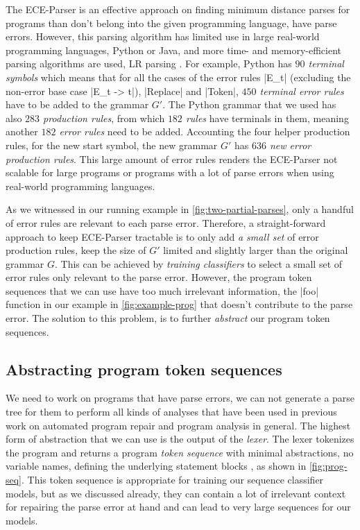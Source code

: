 The ECE-Parser is an effective approach on finding minimum distance parses for
programs than don't belong into the given programming language, \ie have parse
errors. However, this parsing algorithm has limited use in large real-world
programming languages, \eg Python or Java, and more time- and memory-efficient
parsing algorithms are used, \eg LR parsing \etc \citep{Knuth_1965,
Chapman_1987}. For example, Python has \emph{$90$ terminal symbols} which means
that for all the cases of the error rules |E_t| (excluding the non-error base
case |E_t -> t|), |Replace| and |Token|, \emph{$450$ terminal error rules} have
to be added to the grammar $G'$. The Python grammar that we used has also
\emph{$283$ production rules}, from which \emph{$182$ rules} have terminals in
them, meaning another \emph{$182$ error rules} need to be added. Accounting the
four helper production rules, \eg for the new start symbol, the new grammar $G'$
has \emph{$636$ new error production rules}. This large amount of error rules
renders the ECE-Parser not scalable for large programs or programs with a lot of
parse errors when using real-world programming languages.

As we witnessed in our running example in \autoref{fig:two-partial-parses}, only
a handful of error rules are relevant to each parse error. Therefore, a
straight-forward approach to keep ECE-Parser tractable is to only add \emph{a
small set} of error production rules, \ie keep the size of $G'$ limited and
slightly larger than the original grammar $G$. This can be achieved by
\emph{training classifiers} to select a small set of error rules only relevant
to the parse error. However, the program token sequences that we can use have
too much irrelevant information, \eg the |foo| function in our example in
\autoref{fig:example-prog} that doesn't contribute to the parse error. The
solution to this problem, is to further \emph{abstract} our program token
sequences.

\subsection{Abstracting program token sequences}
\label{sec:overview:abstraction}

We need to work on programs that have parse errors, \ie we can not generate a
parse tree for them to perform all kinds of analyses that have been used in
previous work on automated program repair \citep{Sakkas_2020,
Martinez_2013,Gulwani_2018, Wang_2018} and program analysis in general.
%
The highest form of abstraction that we can use is the output of the
\emph{lexer}. The lexer tokenizes the program and returns a program \emph{token
sequence} with minimal abstractions, \eg no variable names, defining the
underlying statement blocks \etc, as shown in \autoref{fig:prog-seq}. This token
sequence is appropriate for training our sequence classifier models, but as we
discussed already, they can contain a lot of irrelevant context for repairing
the parse error at hand and can lead to very large sequences for our models.

